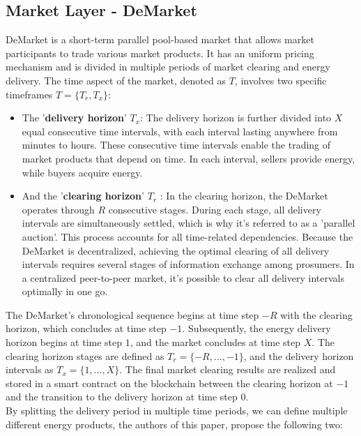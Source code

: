 \subsection{Market Layer - DeMarket}
DeMarket is a short-term parallel pool-based market that allows market participants to trade various market products. It has an uniform pricing mechanism and is divided in multiple
periods of market clearing and energy delivery.
The time aspect of the market, denoted as $T$, involves two specific timeframes $T = \{T_r, T_x\}$:
\begin{itemize}
    \item The '\textbf{delivery horizon}' $T_x$:
          The delivery horizon is further divided into $X$ equal consecutive time intervals, with each interval lasting anywhere from minutes to hours. These consecutive time intervals
          enable the trading of market products that depend on time. In each interval, sellers provide energy, while buyers acquire energy.
    \item And the '\textbf{clearing horizon}' $T_r$ :
          In the clearing horizon, the DeMarket operates through $R$ consecutive stages. During each stage, all delivery intervals are simultaneously settled, which is why it's referred to
          as a 'parallel auction'. This process accounts for all time-related dependencies. Because the DeMarket is decentralized, achieving the optimal clearing of all delivery intervals
          requires several stages of information exchange among prosumers. In a centralized peer-to-peer market, it's possible to clear all delivery intervals optimally in one go.
\end{itemize}
The DeMarket's chronological sequence begins at time step $-R$ with the clearing horizon, which concludes at time step $-1$. Subsequently, the energy delivery horizon begins at time
step $1$, and the market concludes at time step $X$. The clearing horizon stages are defined as $T_r = \{-R,\dots,-1\}$, and the delivery horizon intervals as $T_x = \{1,\dots,X\}$.
The final market clearing results are realized and stored in a smart contract on the blockchain between the clearing horizon at $-1$ and the transition to the delivery horizon at
time step $0$.\\
By splitting the delivery period in multiple time periods, we can define multiple different energy products, the authors of this paper, propose the following two:
